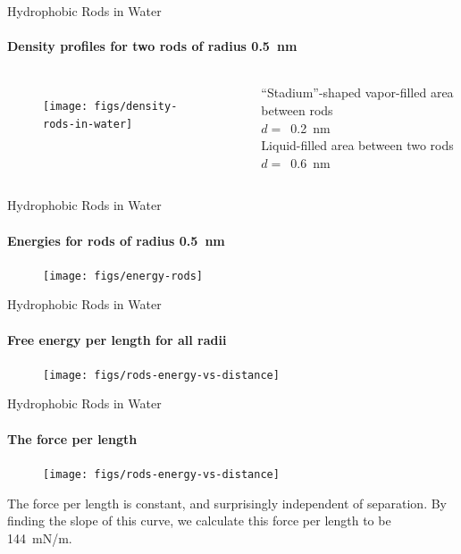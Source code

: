 \documentclass{beamer}
\begin{document}
\begin{frame}[fragile]{Hydrophobic Rods in Water}
\framesubtitle{Density profiles for two rods of radius 0.5~nm}
\begin{columns}
  \begin{figure}
  \texttt{[image: figs/density-rods-in-water]}
  \end{figure} 
 \small{``Stadium''-shaped vapor-filled area between rods}\\
 \vspace{0.3cm}
 \small{$d=$~0.2~nm}\\
 \vspace{1.4cm}
 \small{Liquid-filled area between two rods}\\
 \vspace{0.3cm}
 \small{$d=$~0.6~nm}
\end{columns}
\end{frame}

\begin{frame}[fragile]{Hydrophobic Rods in Water}
\framesubtitle{Energies for rods of radius 0.5~nm}
\begin{figure}
\begin{center}
\texttt{[image: figs/energy-rods]}
\end{center}
\end{figure} 
\end{frame}

\begin{frame}[fragile]{Hydrophobic Rods in Water}
\framesubtitle{Free energy per length for all radii}
\begin{figure}
\begin{center}
\texttt{[image: figs/rods-energy-vs-distance]}
\end{center}
\end{figure} 
\end{frame}

\begin{frame}[fragile]{Hydrophobic Rods in Water}
\framesubtitle{The force per length}
  \begin{figure}
  \texttt{[image: figs/rods-energy-vs-distance]}
  \end{figure}  
The force per length is constant, and surprisingly 
independent of separation. By finding the slope of this curve, we 
calculate this force per length to be 144~mN/m.
\end{frame}
\end{document}
